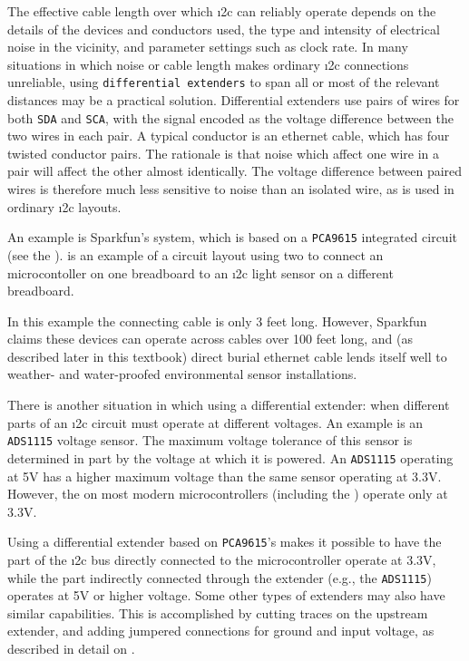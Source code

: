 The effective cable length over which \i2c can reliably operate depends on the details of the devices and conductors used, the type and intensity of electrical noise in the vicinity, and parameter settings such as clock rate.
In many situations in which noise or cable length makes ordinary \i2c connections unreliable, using \texttt{differential extenders} to span all or most of the relevant distances may be a practical solution.
Differential extenders use pairs of wires for both \texttt{SDA} and \texttt{SCA}, with the signal encoded as the voltage difference between the two wires in each pair.
A typical conductor is an ethernet cable, which has four twisted conductor pairs.
The rationale is that noise which affect one wire in a pair will affect the other almost identically.
The voltage difference between paired wires is therefore much less sensitive to noise than an isolated wire, as is used in ordinary \i2c layouts.

An example is Sparkfun's  system, which is based on a \texttt{PCA9615} integrated circuit (see the ).
 is an example of a circuit layout using two  to connect an  microcontoller on one breadboard to an \i2c light sensor on a different breadboard.

In this example the connecting cable is only 3 feet long.
However, Sparkfun claims these devices can operate across cables over 100 feet long, and (as described later in this textbook) direct burial ethernet cable lends itself well to weather- and water-proofed environmental sensor installations.

\begin{kaobox}[frametitle=Potential for change \dots]
There is another situation in which using a differential extender: when different parts of an \i2c circuit must operate at different voltages.
An example is an \texttt{ADS1115} voltage sensor.
The maximum voltage tolerance of this sensor is determined in part by the voltage at which it is powered.
An \texttt{ADS1115} operating at 5V has a higher maximum voltage than the same sensor operating at 3.3V.
However, the \gpios on most modern microcontrollers (including the ) operate only at 3.3V.

Using a differential extender based on \texttt{PCA9615}'s makes it possible to have the part of the \i2c bus directly connected to the microcontroller operate at 3.3V, while the part indirectly connected through the extender (e.g., the \texttt{ADS1115}) operates at 5V or higher voltage.
Some other types of extenders may also have similar capabilities.
This is accomplished by cutting traces on the upstream extender, and adding jumpered connections for ground and input voltage, as described in detail on .
\end{kaobox}



